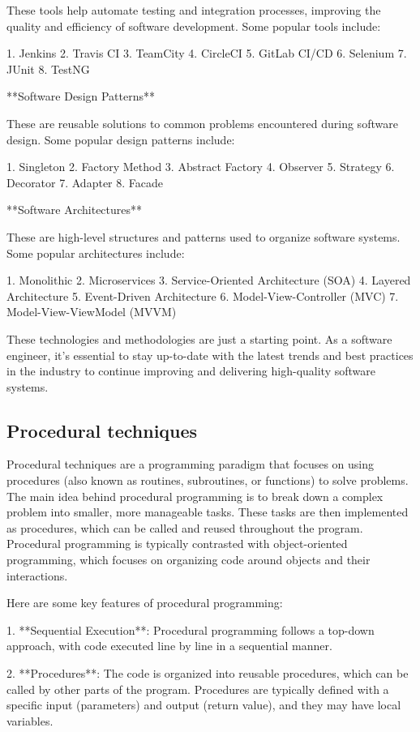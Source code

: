 \documentclass{article}
\begin{document}
These tools help automate testing and integration processes, improving the quality and efficiency of software development. Some popular tools include:

1. Jenkins
2. Travis CI
3. TeamCity
4. CircleCI
5. GitLab CI/CD
6. Selenium
7. JUnit
8. TestNG

**Software Design Patterns**

These are reusable solutions to common problems encountered during software design. Some popular design patterns include:

1. Singleton
2. Factory Method
3. Abstract Factory
4. Observer
5. Strategy
6. Decorator
7. Adapter
8. Facade

**Software Architectures**

These are high-level structures and patterns used to organize software systems. Some popular architectures include:

1. Monolithic
2. Microservices
3. Service-Oriented Architecture (SOA)
4. Layered Architecture
5. Event-Driven Architecture
6. Model-View-Controller (MVC)
7. Model-View-ViewModel (MVVM)

These technologies and methodologies are just a starting point. As a software engineer, it's essential to stay up-to-date with the latest trends and best practices in the industry to continue improving and delivering high-quality software systems.


\subsection{Procedural techniques}

Procedural techniques are a programming paradigm that focuses on using procedures (also known as routines, subroutines, or functions) to solve problems. The main idea behind procedural programming is to break down a complex problem into smaller, more manageable tasks. These tasks are then implemented as procedures, which can be called and reused throughout the program. Procedural programming is typically contrasted with object-oriented programming, which focuses on organizing code around objects and their interactions.

Here are some key features of procedural programming:

1. **Sequential Execution**: Procedural programming follows a top-down approach, with code executed line by line in a sequential manner.

2. **Procedures**: The code is organized into reusable procedures, which can be called by other parts of the program. Procedures are typically defined with a specific input (parameters) and output (return value), and they may have local variables.
\end{document}
